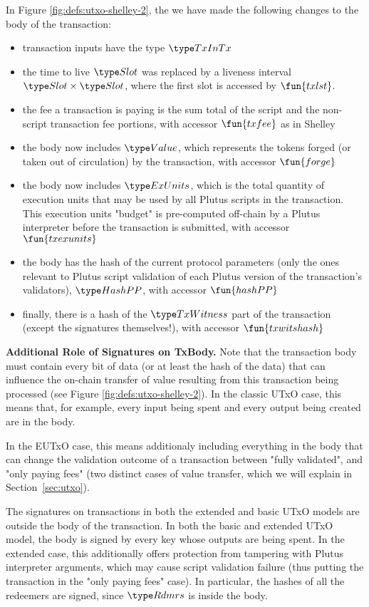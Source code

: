 In Figure \ref{fig:defs:utxo-shelley-2}, the we have made the following changes to
the body of the transaction:

\begin{itemize}
  \item transaction inputs have the type $\TxInTx$
  \item the
  time to live $\Slot$ was replaced by a liveness interval $\Slot \times \Slot$,
  where the first slot is accessed by $\fun{txlst}$.
  \item the fee a transaction is paying is the sum total of the script and the
  non-script transaction fee portions, with accessor $\fun{txfee}$ as in Shelley
  \item the body now includes $\Value$, which represents
  the tokens forged (or taken out of circulation) by the transaction,
  with accessor $\fun{forge}$
  \item the body now includes $\ExUnits$, which is the total quantity of execution units
  that may be used by all Plutus scripts in the transaction.
  This execution units "budget" is pre-computed off-chain by a Plutus interpreter
  before the transaction is submitted, with accessor $\fun{txexunits}$
  \item the body has the hash of the current protocol parameters
  (only the ones relevant to Plutus script validation of each Plutus
  version of the transaction's validators), $\HashPP$, with accessor $\fun{hashPP}$
  \item finally, there is a hash of the $\TxWitness$
  part of the transaction (except the signatures themselves!),
  with accessor $\fun{txwitshash}$
\end{itemize}

\textbf{Additional Role of Signatures on TxBody.}
Note that the transaction body must contain every bit of data
(or at least the hash of the data) that can influence the
on-chain transfer of value resulting from this transaction being processed
(see Figure \ref{fig:defs:utxo-shelley-2}).
In the classic UTxO case, this means that, for example,
every input being spent and every output being created are in the body.

In the EUTxO case, this means additionaly including everything in the body that can change
the validation outcome of a transaction between "fully validated", and "only
paying fees" (two distinct cases of value transfer, which
we will explain in Section~\ref{sec:utxo}).

The signatures on transactions in both the extended and basic UTxO models
are outside the body of the transaction.
In both the basic and extended UTxO model, the body is signed by every key
whose outputs are being spent. In the extended case, this additionally offers
protection from tampering with Plutus interpreter arguments, which may cause
script validation failure (thus putting the transaction in the "only paying fees" case).
In particular, the hashes of all the redeemers are signed, since $\Rdmrs$ is inside
  the body.


